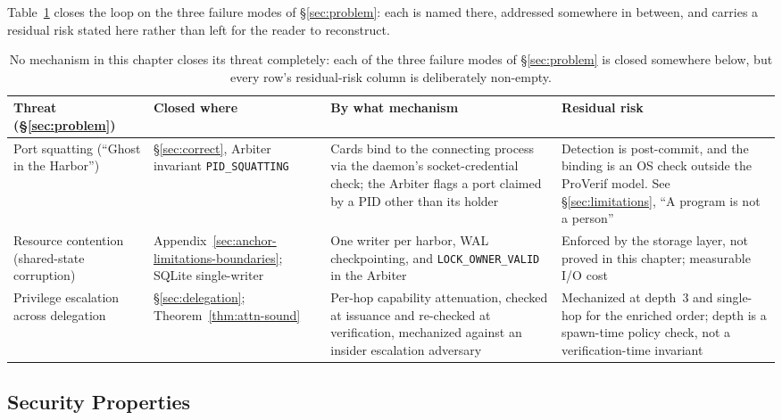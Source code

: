 \documentclass[11pt,a4paper]{article}
\theoremstyle{definition}
\begin{document}
Table~\ref{tab:threat-closure} closes the loop on the three failure modes of \S\ref{sec:problem}: each is named there, addressed somewhere in between, and carries a residual risk stated here rather than left for the reader to reconstruct.

\begin{table}[H]
\centering
\caption{No mechanism in this chapter closes its threat completely: each of the three failure modes of \S\ref{sec:problem} is closed somewhere below, but every row's residual-risk column is deliberately non-empty.}
\label{tab:threat-closure}
\small
\begin{tabularx}{\textwidth}{@{}>{\raggedright\arraybackslash}p{} >{\raggedright\arraybackslash}p{} >{\raggedright\arraybackslash}X >{\raggedright\arraybackslash}X@{}}
\toprule
\textbf{Threat (\S\ref{sec:problem})} & \textbf{Closed where} & \textbf{By what mechanism} & \textbf{Residual risk} \\
\midrule
Port squatting (``Ghost in the Harbor'') &
\S\ref{sec:correct}, Arbiter invariant \texttt{PID\_SQUATTING} &
Cards bind to the connecting process via the daemon's socket-credential check; the Arbiter flags a port claimed by a PID other than its holder &
Detection is post-commit, and the binding is an OS check outside the ProVerif model. See \S\ref{sec:limitations}, ``A program is not a person'' \\
\addlinespace
Resource contention (shared-state corruption) &
Appendix~\ref{sec:anchor-limitations-boundaries}; SQLite single-writer &
One writer per harbor, WAL checkpointing, and \texttt{LOCK\_OWNER\_VALID} in the Arbiter &
Enforced by the storage layer, not proved in this chapter; measurable I/O cost \\
\addlinespace
Privilege escalation across delegation &
\S\ref{sec:delegation}; Theorem~\ref{thm:attn-sound} &
Per-hop capability attenuation, checked at issuance and re-checked at verification, mechanized against an insider escalation adversary &
Mechanized at depth~3 and single-hop for the enriched order; depth is a spawn-time policy check, not a verification-time invariant \\
\bottomrule
\end{tabularx}
\end{table}

\subsection{Security Properties}
\end{document}
